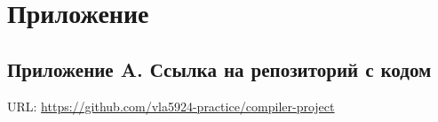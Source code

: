 \newpage
\section*{Приложение}

\subsection*{Приложение A. Ссылка на репозиторий с кодом}

\noindent
URL: \url{https://github.com/vla5924-practice/compiler-project}
